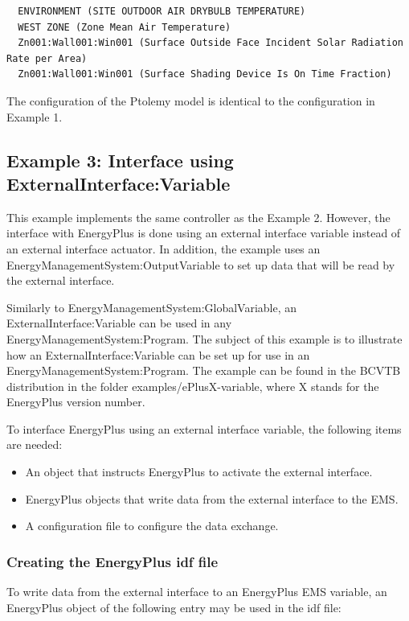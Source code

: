 \begin{lstlisting}
  ENVIRONMENT (SITE OUTDOOR AIR DRYBULB TEMPERATURE)
  WEST ZONE (Zone Mean Air Temperature)
  Zn001:Wall001:Win001 (Surface Outside Face Incident Solar Radiation Rate per Area)
  Zn001:Wall001:Win001 (Surface Shading Device Is On Time Fraction)
\end{lstlisting}

The configuration of the Ptolemy model is identical to the configuration in Example 1.

\subsection{Example 3: Interface using ExternalInterface:Variable}\label{example-3-interface-using-externalinterfacevariable}

This example implements the same controller as the Example 2. However, the interface with EnergyPlus is done using an external interface variable instead of an external interface actuator. In addition, the example uses an EnergyManagementSystem:OutputVariable to set up data that will be read by the external interface.

Similarly to EnergyManagementSystem:GlobalVariable, an ExternalInterface:Variable can be used in any EnergyManagementSystem:Program. The subject of this example is to illustrate how an ExternalInterface:Variable can be set up for use in an EnergyManagementSystem:Program. The example can be found in the BCVTB distribution in the folder examples/ePlusX-variable, where X stands for the EnergyPlus version number.

To interface EnergyPlus using an external interface variable, the following items are needed:

\begin{itemize}
\item
  An object that instructs EnergyPlus to activate the external interface.
\item
  EnergyPlus objects that write data from the external interface to the EMS.
\item
  A configuration file to configure the data exchange.
\end{itemize}

\subsubsection{Creating the EnergyPlus idf file}\label{creating-the-energyplus-idf-file-2}

To write data from the external interface to an EnergyPlus EMS variable, an EnergyPlus object of the following entry may be used in the idf file:

